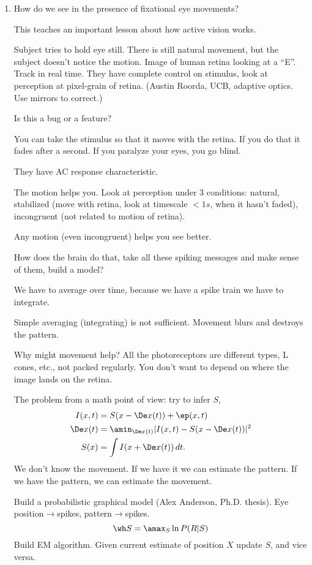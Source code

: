 \begin{enumerate}
\item
How do we see in the presence of fixational eye movements?

This teaches an important lesson about how active vision works.

Subject tries to hold eye still. There is still natural movement, but the subject doesn't notice the motion. Image of human retina looking at a ``E''. Track in real time. They have complete control on stimulus, look at perception at pixel-grain of retina. (Austin Roorda, UCB, adaptive optics. Use mirrors to correct.)

Is this a bug or a feature?

You can take the stimulus so that it moves with the retina. If you do that it fades after a second. If you paralyze your eyes, you go blind.

They have AC response characteristic. %

The motion helps you. Look at perception under 3 conditions: natural, stabilized (move with retina, look at timescale $<1s$, when it hasn't faded), incongruent (not related to motion of retina).

Any motion (even incongruent) helps you see better.

How does the brain do that, take all these spiking messages and make sense of them, build a model?

We have to average over time, because we have a spike train we have to integrate.

Simple averaging (integrating) is not sufficient. Movement blurs and destroys the pattern.

Why might movement help? All  the photoreceptors are different types, L cones, etc., not packed regularly. You don't want to depend on where the image lands on the retina.

The problem from a math point of view: try to infer $S$,
\begin{align}
I(x,t) &=S(x-\De x(t)) + \ep(x,t)\\
\De x(t)&=\amin_{\De x(t)} |I(x,t) - S(x-\De x(t))|^2\\
S(x)&=\int I(x+\De x(t))\,dt.
\end{align}
We don't know the movement. If we have it we can estimate the pattern. If we have the pattern, we can estimate the movement.

Build a probabilistic graphical model (Alex Anderson, Ph.D. thesis).  %
Eye position$\to$spikes, pattern$\to$spikes.
$$
\wh S = \amax_S \ln P(R|S) %
$$
Build EM algorithm. Given current estimate of position $X$ update $S$, and vice versa.


\end{enumerate}
